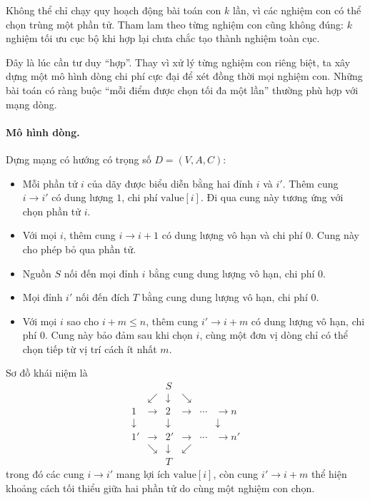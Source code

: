 \documentclass[11pt]{article}
\begin{document}
Không thể chỉ chạy quy hoạch động bài toán con \(k\) lần, vì các nghiệm con
có thể chọn trùng một phần tử. Tham lam theo từng nghiệm con cũng không đúng:
\(k\) nghiệm tối ưu cục bộ khi hợp lại chưa chắc tạo thành nghiệm toàn cục.

Đây là lúc cần tư duy ``hợp''. Thay vì xử lý từng nghiệm con riêng biệt, ta
xây dựng một mô hình dòng chi phí cực đại để xét đồng thời mọi nghiệm con.
Những bài toán có ràng buộc ``mỗi điểm được chọn tối đa một lần'' thường phù
hợp với mạng dòng.

\paragraph{Mô hình dòng.}
Dựng mạng có hướng có trọng số \(D=(V,A,C)\):
\begin{itemize}
  \item Mỗi phần tử \(i\) của dãy được biểu diễn bằng hai đỉnh \(i\) và \(i'\).
        Thêm cung \(i\to i'\) có dung lượng \(1\), chi phí
        \(\mathrm{value}[i]\). Đi qua cung này tương ứng với chọn phần tử \(i\).
  \item Với mọi \(i\), thêm cung \(i\to i+1\) có dung lượng vô hạn và chi phí
        \(0\). Cung này cho phép bỏ qua phần tử.
  \item Nguồn \(S\) nối đến mọi đỉnh \(i\) bằng cung dung lượng vô hạn, chi phí
        \(0\).
  \item Mọi đỉnh \(i'\) nối đến đích \(T\) bằng cung dung lượng vô hạn, chi
        phí \(0\).
  \item Với mọi \(i\) sao cho \(i+m\le n\), thêm cung \(i'\to i+m\) có dung
        lượng vô hạn, chi phí \(0\). Cung này bảo đảm sau khi chọn \(i\), cùng
        một đơn vị dòng chỉ có thể chọn tiếp từ vị trí cách ít nhất \(m\).
\end{itemize}

Sơ đồ khái niệm là
\[
\begin{array}{cccccc}
&&S&&&\\
&\swarrow&\downarrow&\searrow&&\\
1&\to&2&\to&\cdots&\to n\\
\downarrow&&\downarrow&&&\downarrow\\
1'&\to&2'&\to&\cdots&\to n'\\
&\searrow&\downarrow&\swarrow&&\\
&&T&&&
\end{array}
\]
trong đó các cung \(i\to i'\) mang lợi ích \(\mathrm{value}[i]\), còn cung
\(i'\to i+m\) thể hiện khoảng cách tối thiểu giữa hai phần tử do cùng một
nghiệm con chọn.
\end{document}
